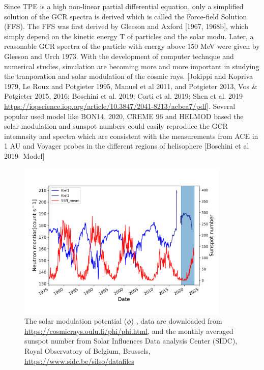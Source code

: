 Since TPE is a high non-linear partial differential equation, only a simplified solution of the GCR spectra is derived which is called the Force-field Solution (FFS). The FFS was first derived by Gleeson and Axford [1967, 1968b], which simply depend on the kinetic energy T of particles and the solar modu. Later, a reasonable GCR spectra of the particle with energy above 150 MeV were given by Gleeson and Urch 1973.
With the development of computer technque and numerical studies, simulation are becoming more and more important in studying the tranporation and solar modulation of the cosmic rays. [Jokippi and Kopriva 1979, Le Roux and Potgieter 1995, Manuel et al 2011, and Potgieter 2013, Vos \& Potgieter 2015, 2016; Boschini et al. 2019;
Corti et al. 2019; Shen et al. 2019 \url{https://iopscience.iop.org/article/10.3847/2041-8213/acbea7/pdf}]. 
Several popular used model like BON14, 2020, CREME 96 and HELMOD based the solar modulation and sunspot numbers could easily reproduce the GCR intemnsity and spectra which are consistent with the measurements from \ac{ACE} in 1 AU and Voyager probes in the different regions of helisophere [Boschini et al 2019- Model]

\begin{figure}
	\centering
	\includegraphics[width = 0.9\textwidth]{images/Solar_modulation.png}
	\caption{The solar modulation potential ($\phi$) \cite{Usoskin 2011}, data are downloaded from \url{https://cosmicrays.oulu.fi/phi/phi.html}, and the monthly averaged sunspot number from Solar Influences Data analysis Center (SIDC), Royal Observatory of Belgium, Brussels, \url{https://www.sidc.be/silso/datafiles}}
	\label{Fig:Solar_modulation}
\end{figure}


